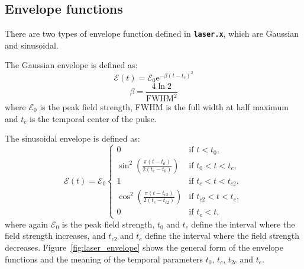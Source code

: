 \documentclass[a4paper,10pt,DIV=15,openany]{scrbook}
\newcommand{\ttt}[1]{\textbf{\texttt{#1}}}
\newcommand{\E}{\ensuremath{\mathrm{e}}}
\begin{document}
\subsection{Envelope functions}

There are two types of envelope function defined in \ttt{laser.x}, which are Gaussian and sinusoidal.

The Gaussian envelope is defined as:
\begin{equation}
  \mathcal{E}(t)=\mathcal{E}_0 \E^{-\beta(t-t_c)^2}\label{eq:laser_gauss_1}
\end{equation}
\begin{equation}
  \beta=\frac{4\ln 2}{\mathrm{FWHM}^2}\label{eq:laser_gauss_2}
\end{equation}
where $\mathcal{E}_0$ is the peak field strength, FWHM is the full width at half maximum and $t_c$ is the temporal center of the pulse.

The sinusoidal envelope is defined as:
\begin{equation}
  \mathcal{E}(t)=\mathcal{E}_0
  \begin{cases}
    0                                                   &\text{if } t<t_0,\\
    \sin^2\left(\frac{\pi(t-t_0)}{2(t_c-t_0)}\right)      &\text{if } t_0<t<t_c,\\
    1                                                   &\text{if } t_c<t<t_{c2},\\
    \cos^2\left(\frac{\pi(t-t_{c2})}{2(t_e-t_{c2})}\right)      &\text{if } t_{c2}<t<t_e,\\
    0                                                   &\text{if } t_e<t,\label{eq:laser_sinus}
  \end{cases}
\end{equation}
where again $\mathcal{E}_0$ is the peak field strength, $t_0$ and $t_c$ define the interval where the field strength increases, and $t_{c2}$ and $t_e$ define the interval where the field strength decreases. Figure~\ref{fig:laser_envelope} shows the general form of the envelope functions and the meaning of the temporal parameters $t_0$, $t_c$, $t_{2c}$ and $t_e$.
\end{document}
